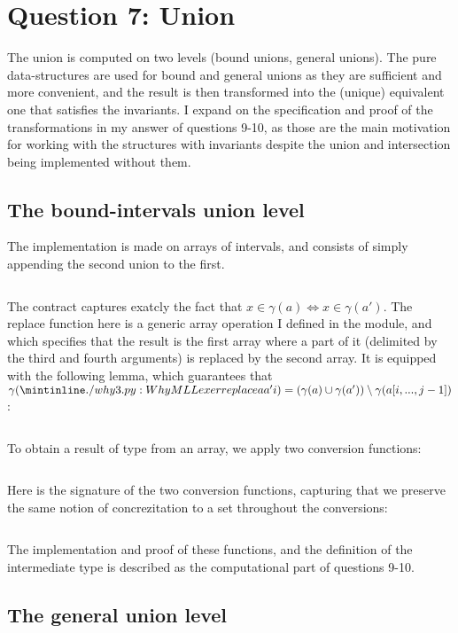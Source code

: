\section{Question 7: Union}\label{q6}
%
The union is computed on two levels (bound unions, general unions).
The pure data-structures are used for bound and general unions as they are sufficient
and more convenient,
%
and the result is then transformed into the (unique) equivalent one that satisfies
the invariants. I expand on the specification and proof of the transformations in my
answer of questions 9-10, as those are the main motivation for working with the
structures with invariants despite the union and intersection being implemented
without them.


\subsection{The bound-intervals union level}

The implementation is made on arrays of intervals, and consists of simply appending
the second union to the first.
%
\inputminted{\whyml}{why3code/gen_union_union.mlw}
%
The contract captures exatcly the fact that $x\in \gamma(a) \iff x\in\gamma(a')$. The
replace function here is a generic array operation I defined in the 
module, and which specifies that the result is the first array where a part of it
(delimited by the third and fourth arguments) is replaced by the second array.
%
It is equipped with the following lemma, which guarantees that
$\gamma(\minline{replace a a' i }) = (\gamma(a) \cup
\gamma(a'))\setminus\gamma(a[i,...,j-1])$:
\inputminted{\whyml}{why3code/replace_lemma.mlw}

To obtain a result of type  from an array, we apply two
conversion functions:
\inputminted{\whyml}{why3code/union_union.mlw}

Here is the signature of the two conversion functions, capturing that we preserve the
same notion of concrezitation to a set throughout the conversions:
\inputminted{\whyml}{why3code/bound_convs_contracts.mlw}

The implementation and proof of these functions, and the definition of the
 intermediate type is described as the computational part of
questions 9-10.

\subsection{The general union level}

